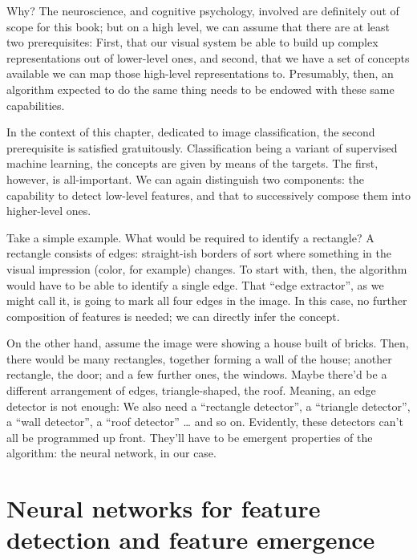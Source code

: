 \documentclass[
  letterpaper,
]{krantz}
\begin{document}
Why? The neuroscience, and cognitive psychology, involved are definitely
out of scope for this book; but on a high level, we can assume that
there are at least two prerequisites: First, that our visual system be
able to build up complex representations out of lower-level ones, and
second, that we have a set of concepts available we can map those
high-level representations to. Presumably, then, an algorithm expected
to do the same thing needs to be endowed with these same capabilities.

In the context of this chapter, dedicated to image classification, the
second prerequisite is satisfied gratuitously. Classification being a
variant of supervised machine learning, the concepts are given by means
of the targets. The first, however, is all-important. We can again
distinguish two components: the capability to detect low-level features,
and that to successively compose them into higher-level ones.

Take a simple example. What would be required to identify a rectangle? A
rectangle consists of edges: straight-ish borders of sort where
something in the visual impression (color, for example) changes. To
start with, then, the algorithm would have to be able to identify a
single edge. That ``edge extractor'', as we might call it, is going to
mark all four edges in the image. In this case, no further composition
of features is needed; we can directly infer the concept.

On the other hand, assume the image were showing a house built of
bricks. Then, there would be many rectangles, together forming a wall of
the house; another rectangle, the door; and a few further ones, the
windows. Maybe there'd be a different arrangement of edges,
triangle-shaped, the roof. Meaning, an edge detector is not enough: We
also need a ``rectangle detector'', a ``triangle detector'', a ``wall
detector'', a ``roof detector'' \ldots{} and so on. Evidently, these
detectors can't all be programmed up front. They'll have to be emergent
properties of the algorithm: the neural network, in our case.

\hypertarget{neural-networks-for-feature-detection-and-feature-emergence}{%
\section{\texorpdfstring{Neural networks for feature
detection and feature
emergence}{Neural networks for feature detection and feature emergence}}\label{neural-networks-for-feature-detection-and-feature-emergence}}
\end{document}
